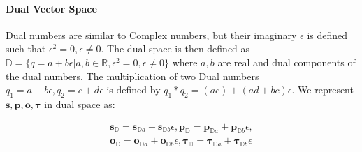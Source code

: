 \documentclass[letterpaper]{article} %
\begin{document}
\paragraph{\textbf{Dual Vector Space}}
Dual numbers \cite{dualangeles1998application,metahelzer2000special} are  similar to Complex numbers,
but their imaginary $\epsilon$ is defined such that $\epsilon^2 = 0, \epsilon \neq 0$.
The dual space is then defined as $\mathbb{D} = \{q = a + b \epsilon | a,b \in \mathbb{R}, \epsilon^2 = 0, \epsilon \neq 0\}$ where $a,b$ are real and dual components of the dual numbers. The multiplication of two Dual numbers $q_1= a+b\epsilon, q_2=c+d\epsilon$ is defined by $q_1 * q_2 = (ac) + (ad + bc) \epsilon$. We represent $\boldsymbol{s,p,o, \tau}$ in dual space as:

\begin{equation}
\label{eq:dual}
\begin{aligned}
        \boldsymbol{s_{\mathbb{D}}}=\boldsymbol{s}_{\mathbb{D}a} + \boldsymbol{s}_{\mathbb{D}b}\epsilon, \boldsymbol{p_{\mathbb{D}}}=\boldsymbol{p}_{\mathbb{D}a} + \boldsymbol{p}_{\mathbb{D}b}\epsilon,  \\ \boldsymbol{o_{\mathbb{D}}}=\boldsymbol{o}_{\mathbb{D}a} + \boldsymbol{o}_{\mathbb{D}b}\epsilon, \boldsymbol{\tau_{\mathbb{D}}}=\boldsymbol{\tau}_{\mathbb{D}a} + \boldsymbol{\tau}_{\mathbb{D}b}\epsilon
\end{aligned}
\end{equation}


\end{document}
